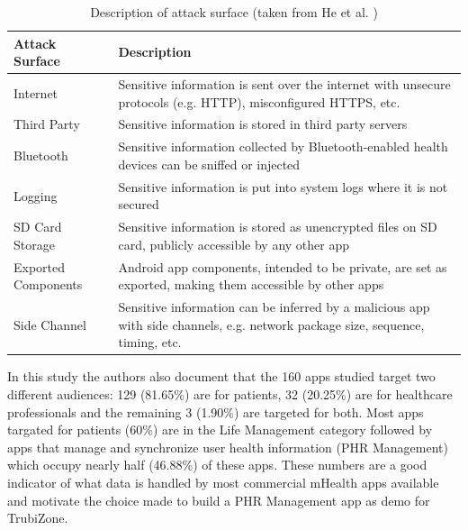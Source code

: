 \begin{table}[t]
	\caption {Description of attack surface (taken from He et al. \cite{he2014security})}
	\label{tab:attacksurfaces}
	\begin{tabular}{|>{\raggedright}p{2cm}|>{\raggedright\arraybackslash}p{10cm}|}
		\hline
		\textbf{Attack Surface}      & \textbf{Description}                                                                                                                    \\ \hline
		Internet            & Sensitive information is sent over the internet with unsecure protocols (e.g. HTTP), misconfigured HTTPS, etc.                 \\ \hline
		Third Party         & Sensitive information is stored in third party servers                                                                         \\ \hline
		Bluetooth           & Sensitive information collected by Bluetooth-enabled health devices can be sniffed or injected                                 \\ \hline
		Logging             & Sensitive information is put into system logs where it is not secured                                                          \\ \hline
		SD Card Storage     & Sensitive information is stored as unencrypted files on SD card, publicly accessible by any other app                          \\ \hline
		Exported Components &  Android app components, intended to be private, are set as exported, making them accessible by other apps                     \\ \hline
		Side Channel        & Sensitive information can be inferred by a malicious app with side channels, e.g. network package size, sequence, timing, etc. \\ \hline
	\end{tabular}
\end{table}

In this study the authors also document that the 160 apps studied target two different audiences: 129 (81.65\%) are for patients, 32 (20.25\%) are for healthcare professionals and the remaining 3 (1.90\%) are targeted for both. Most apps targated for patients (60\%) are in the Life Management category followed by apps that manage and synchronize user health information (PHR Management) which occupy nearly half (46.88\%) of these apps. These numbers are a good indicator of what data is handled by most commercial mHealth apps available and motivate the choice made to build a PHR Management app as demo for TrubiZone.

